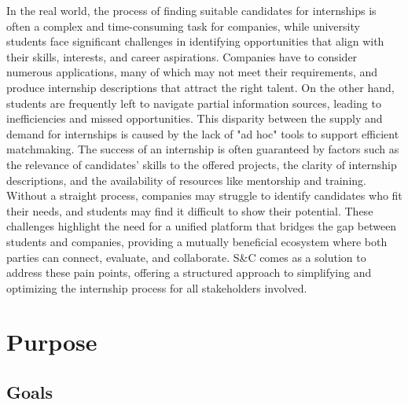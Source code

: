 In the real world, the process of finding suitable candidates for internships is often a complex and time-consuming task for companies, while university students face significant challenges in identifying opportunities that align with their skills, interests, and career aspirations. Companies have to consider numerous applications, many of which may not meet their requirements, and produce internship descriptions that attract the right talent. On the other hand, students are frequently left to navigate partial information sources, leading to inefficiencies and missed opportunities.
This disparity between the supply and demand for internships is caused by the lack of "ad hoc" tools to support efficient matchmaking. The success of an internship is often guaranteed by factors such as the relevance of candidates' skills to the offered projects, the clarity of internship descriptions, and the availability of resources like mentorship and training. Without a straight process, companies may struggle to identify candidates who fit their needs, and students may find it difficult to show their potential.
These challenges highlight the need for a unified platform that bridges the gap between students and companies, providing a mutually beneficial ecosystem where both parties can connect, evaluate, and collaborate. S\&C comes as a solution to address these pain points, offering a structured approach to simplifying and optimizing the internship process for all stakeholders involved.
\newpage

\section{Purpose}
\label{sec:purpose}%

\subsection{Goals}
\label{subsec:goals}%
\setcounter{g}{1}
\newcommand{\cg}{\theg\stepcounter{g}}

